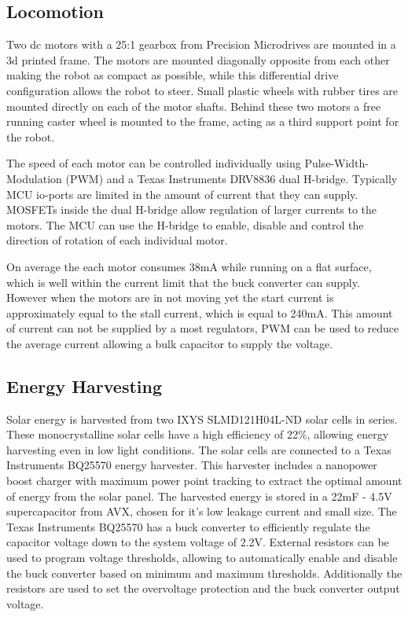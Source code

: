 \subsection{Locomotion}


Two dc motors with a 25:1 gearbox from Precision Microdrives are mounted in a 3d printed frame. %
The motors are mounted diagonally opposite from each other making the robot as compact as possible, while this differential drive configuration allows the robot to steer.
Small plastic wheels with rubber tires are mounted directly on each of the motor shafts.
Behind these two motors a free running caster wheel is mounted to the frame, acting as a third support point for the robot.

The speed of each motor can be controlled individually using Pulse-Width-Modulation (PWM) and a Texas Instruments DRV8836 dual H-bridge.
Typically MCU io-ports are limited in the amount of current that they can supply.
MOSFETs inside the dual H-bridge allow regulation of larger currents to the motors.
The MCU can use the H-bridge to enable, disable and control the direction of rotation of each individual motor.


On average the each motor consumes 38mA while running on a flat surface, which is well within the current limit that the buck converter can supply.
However when the motors are in not moving yet the start current is approximately equal to the stall current, which is equal to 240mA.
This amount of current can not be supplied by a most regulators, PWM can be used to reduce the average current allowing a bulk capacitor to supply the voltage.

\subsection{Energy Harvesting}
\label{subsec:energy_harvesting}

Solar energy is harvested from two IXYS SLMD121H04L-ND solar cells in series.
These monocrystalline solar cells have a high efficiency of 22\%, allowing energy harvesting even in low light conditions.
The solar cells are connected to a Texas Instruments BQ25570 energy harvester. 
This harvester includes a nanopower boost charger with maximum power point tracking to extract the optimal amount of energy from the solar panel. 
The harvested energy is stored in a 22mF - 4.5V supercapacitor from AVX, chosen for it's low leakage current and small size.
The Texas Instruments BQ25570 has a buck converter to efficiently regulate the capacitor voltage down to the system voltage of 2.2V.
External resistors can be used to program voltage thresholds, allowing to automatically enable and disable the buck converter based on minimum and maximum thresholds.
Additionally the resistors are used to set the overvoltage protection and the buck converter output voltage.

